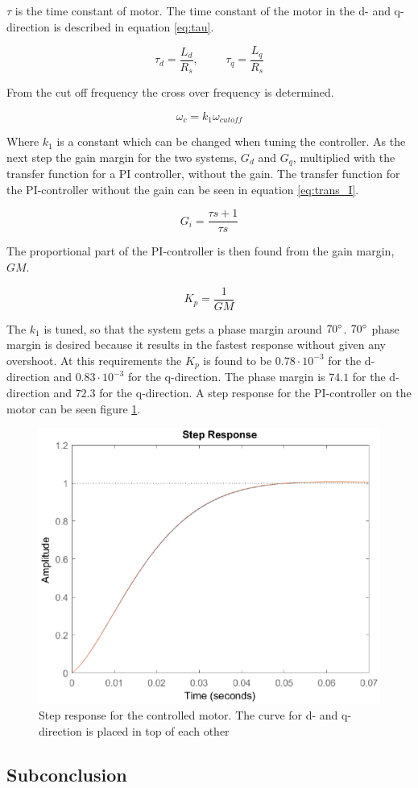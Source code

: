 $\tau$ is the time constant of motor. The time constant of the motor in the d- and q-direction is described in equation \ref{eq:tau}.

\begin{equation}
    \label{eq:tau}
    \tau_d = \frac{L_d}{R_s}
    , \hspace{1cm}
    \tau_q = \frac{L_q}{R_s}
\end{equation}

From the cut off frequency the cross over frequency is determined.

\begin{equation}
    \label{eq:crossover}
     \omega_c = k_1 \omega_{cutoff}
\end{equation}

Where $k_1$ is a constant which can be changed when tuning the controller.
As the next step the gain margin for the two systems, $G_d$ and $G_q$, multiplied with the transfer function for a PI controller, without the gain. The transfer function for the PI-controller without the gain can be seen in equation \ref{eq:trans_I}.

\begin{equation}
    \label{eq:trans_I}
    G_i = \frac{\tau s + 1}{\tau s}
\end{equation}

The proportional part of the PI-controller is then found from the gain margin, $GM$.

\begin{equation}
    \label{eq:gain}
    K_p = \frac{1}{GM} 
\end{equation}

The $k_1$ is tuned, so that the system gets a phase margin around $70 \degree$. $70 \degree$ phase margin is desired because it results in the fastest response without given any overshoot. At this requirements the $K_p$ is found to be $0.78 \cdot 10^{-3}$ for the d-direction and $0.83 \cdot 10^{-3}$ for the q-direction. The phase margin is $74.1$ for the d-direction and $72.3$ for the q-direction.
A step response for the PI-controller on the motor can be seen figure \ref{fig:step}.

\begin{figure}[H]
	\centering
	\includegraphics[width=0.6\linewidth]{pictures/control/step_PI.eps}
	\caption{Step response for the controlled motor. The curve for d- and q-direction is placed in top of each other}
	\label{fig:step}
\end{figure}

\subsection*{Subconclusion}



